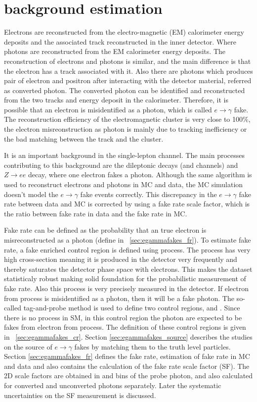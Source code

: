 \section{\efake background estimation}
\label{sec:background-estimation-efake}
Electrons are reconstructed from the electro-magnetic (EM) calorimeter energy deposits and the associated track reconstructed in the inner detector. Where photons are reconstructed from the EM calorimeter energy deposits. The reconstruction of electrons and photons is similar, and the main difference is that the electron has a track associated with it. Also there are photons which produces pair of electron and positron after interacting with the detector material, referred as converted photon. The converted photon can be identified and reconstructed from the two tracks and energy deposit in the calorimeter. Therefore, it is possible that an electron is misidentified as a photon, which is called $e\to\gamma$ fake. The reconstruction efficiency of the electromagnetic cluster is very close to 100\%, the electron misreonstruction as photon is mainly due to tracking inefficiency or the bad matching between the track and the cluster.

It is an important background in the single-lepton channel. The main processes contributing to this background are the \ttbar dileptonic decays (\chee and \chemu channels) and $Z\to ee$ decay, where one electron fakes a photon. Although the same algorithm is used to reconstruct electrons and photons in MC and data, the MC simulation doesn't model the $e\to\gamma$ fake events correctly. This discrepancy in the $e\to\gamma$ fake rate between data and MC is corrected by using a fake rate scale factor, which is the ratio between fake rate in data and the fake rate in MC. 

Fake rate can be defined as the probability that an true electron is misreconstructed as a photon (define in ~\cref{sec:egammafakes_fr}). To estimate fake rate, a fake enriched control region is defined using \zee process. The \zee process has very high cross-section meaning it is produced in the detector very frequently and thereby saturates the detector phase space with electrons. This makes the dataset statisticaly robust making solid foundation for the probabilistic measurement of fake rate. Also this process is very precisely measured in the detector. If electron from \zee process is misidentified as a photon, then it will be a fake photon. The so-called tag-and-probe method is used to define two control regions, \zee and \zegamma. Since there is no \zegamma process in SM, in this control region the photon are expected to be fakes from electron from \zee process. The definition of these control regions is given in ~\cref{sec:egammafakes_cr}. Section \ref{sec:egammafakes_source} describes the studies on the source of $e\to\gamma$ fakes by matching them to the truth level particles. Section \ref{sec:egammafakes_fr} defines the fake rate, estimation of fake rate in MC and data and also contains the calculation of the fake rate scale factor (SF). The 2D scale factors are obtained in \pt and \abseta bins of the probe photon, and also calculated for converted and unconverted photons separately. Later the systematic uncertainties on the SF measurement is discussed.


